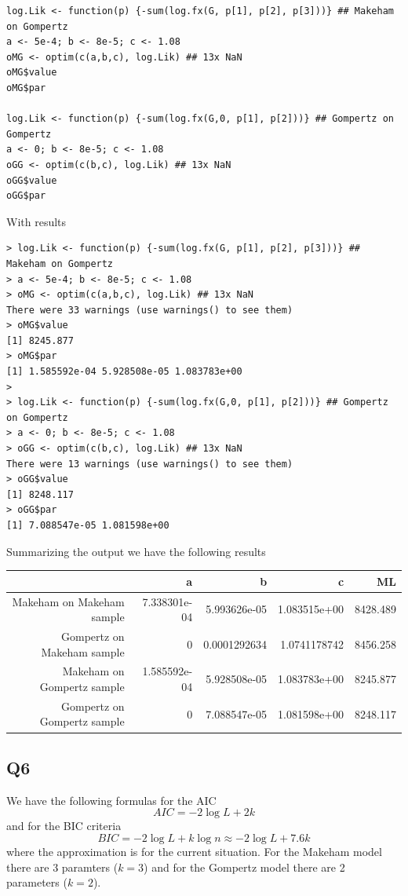 \begin{verbatim}
log.Lik <- function(p) {-sum(log.fx(G, p[1], p[2], p[3]))} ## Makeham on Gompertz
a <- 5e-4; b <- 8e-5; c <- 1.08
oMG <- optim(c(a,b,c), log.Lik) ## 13x NaN
oMG$value
oMG$par

log.Lik <- function(p) {-sum(log.fx(G,0, p[1], p[2]))} ## Gompertz on Gompertz
a <- 0; b <- 8e-5; c <- 1.08
oGG <- optim(c(b,c), log.Lik) ## 13x NaN
oGG$value
oGG$par
\end{verbatim}

With results 

\begin{verbatim}
> log.Lik <- function(p) {-sum(log.fx(G, p[1], p[2], p[3]))} ## Makeham on Gompertz
> a <- 5e-4; b <- 8e-5; c <- 1.08
> oMG <- optim(c(a,b,c), log.Lik) ## 13x NaN
There were 33 warnings (use warnings() to see them)
> oMG$value
[1] 8245.877
> oMG$par
[1] 1.585592e-04 5.928508e-05 1.083783e+00
> 
> log.Lik <- function(p) {-sum(log.fx(G,0, p[1], p[2]))} ## Gompertz on Gompertz
> a <- 0; b <- 8e-5; c <- 1.08
> oGG <- optim(c(b,c), log.Lik) ## 13x NaN
There were 13 warnings (use warnings() to see them)
> oGG$value
[1] 8248.117
> oGG$par
[1] 7.088547e-05 1.081598e+00
\end{verbatim}

Summarizing the output we have the following results 

\begin{center}

\begin{tabular}{r | r | r | r | r}
 							 & a & b & c & ML \\ \hline
 Makeham on Makeham sample 	 & 7.338301e-04 & 5.993626e-05 & 1.083515e+00 & 8428.489 \\
 Gompertz on Makeham sample  & 0 & 0.0001292634 & 1.0741178742 & 8456.258 \\
 Makeham on Gompertz sample  & 1.585592e-04 & 5.928508e-05 & 1.083783e+00 & 8245.877 \\
 Gompertz on Gompertz sample & 0 & 7.088547e-05 & 1.081598e+00 & 8248.117 
 
\end{tabular}

\end{center}

\subsection*{Q6}

We have the following formulas for the AIC
\begin{equation}
AIC = -2 \log L + 2k
\end{equation}
and for the BIC criteria 
\begin{equation}
BIC = -2 \log L + k \log n \approx -2 \log L + 7.6k
\end{equation}
where the approximation is for the current situation. For the Makeham model there are 3 paramters ($k = 3$) and for the Gompertz model there are 2 parameters ($k=2$).

